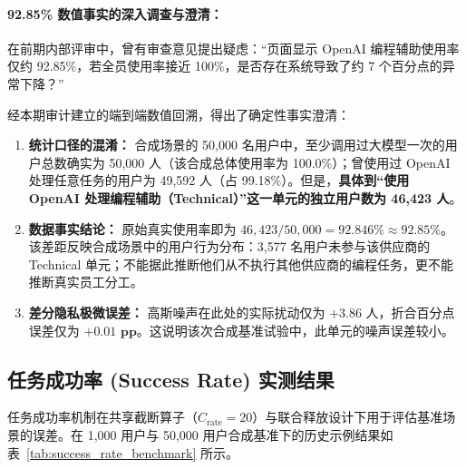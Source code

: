 \paragraph{92.85\% 数值事实的深入调查与澄清：}
在前期内部评审中，曾有审查意见提出疑虑：“页面显示 OpenAI 编程辅助使用率仅约 92.85\%，若全员使用率接近 100\%，是否存在系统导致了约 7 个百分点的异常下降？”

经本期审计建立的端到端数值回溯，得出了确定性事实澄清：
\begin{enumerate}[label=(\arabic*), leftmargin=2em]
  \item \textbf{统计口径的混淆：} 合成场景的 50,000 名用户中，至少调用过大模型一次的用户总数确实为 50,000 人（该合成总体使用率为 100.0\%）；曾使用过 OpenAI 处理任意任务的用户为 49,592 人（占 99.18\%）。但是，\textbf{具体到“使用 OpenAI 处理编程辅助（Technical）”这一单元的独立用户数为 46,423 人}。
  \item \textbf{数据事实结论：} 原始真实使用率即为 $46,423 / 50,000 = \mathbf{92.846\% \approx 92.85\%}$。该差距反映合成场景中的用户行为分布：3,577 名用户未参与该供应商的 Technical 单元；不能据此推断他们从不执行其他供应商的编程任务，更不能推断真实员工分工。
  \item \textbf{差分隐私极微误差：} 高斯噪声在此处的实际扰动仅为 $+3.86$ 人，折合百分点误差仅为 $\mathbf{+0.01\text{ pp}}$。这说明该次合成基准试验中，此单元的噪声误差较小。
\end{enumerate}

\subsection{任务成功率 (Success Rate) 实测结果}
任务成功率机制在共享截断算子（$C_{\text{rate}} = 20$）与联合释放设计下用于评估基准场景的误差。在 1,000 用户与 50,000 用户合成基准下的历史示例结果如表~\ref{tab:success_rate_benchmark} 所示。

\begin{table}[htbp]
\centering
\small
\caption{任务成功率 (Success Rate) 实测精度对比表 ($\varepsilon=1.0, \delta=10^{-6}$)}
\label{tab:success_rate_benchmark}
\end{table}

